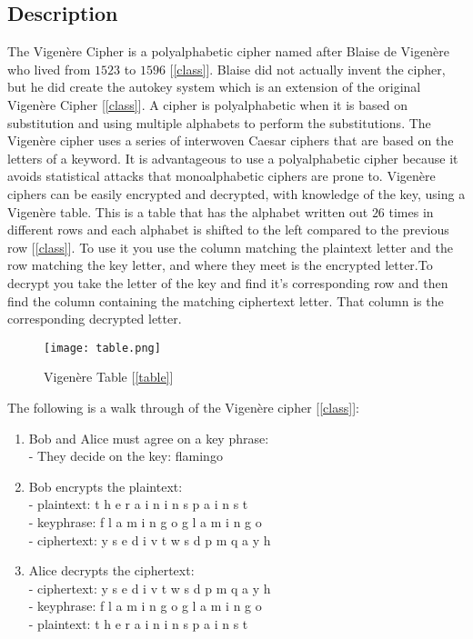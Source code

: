\documentclass[12pt]{article}
\begin{document}
\subsection{Description}
The Vigen\`ere Cipher is a polyalphabetic cipher named after Blaise de Vigen\`ere who lived from $1523$ to $1596$ [\ref{class}]. Blaise did not actually invent the cipher, but he did create the autokey system which is an extension of the original Vigen\`ere Cipher [\ref{class}]. A cipher is polyalphabetic when it is based on substitution and using multiple alphabets to perform the substitutions. The Vigen\`ere cipher uses a series of interwoven Caesar ciphers that are based on the letters of a keyword. It is advantageous to use a polyalphabetic cipher because it avoids statistical attacks that monoalphabetic ciphers are prone to. Vigen\`ere ciphers can be easily encrypted and decrypted, with knowledge of the key, using a Vigen\`ere table. This is a table that has the alphabet written out $26$ times in different rows and each alphabet is shifted to the left compared to the previous row [\ref{class}]. To use it you use the column matching the plaintext letter and the row matching the key letter, and where they meet is the encrypted letter.To decrypt you take the letter of the key and find it's corresponding row and then find the column containing the matching ciphertext letter. That column is the corresponding decrypted letter.
\begin{figure}[H]
        \texttt{[image: table.png]}
        \caption{Vigen\`ere Table [\ref{table}]}
        \label{fig:340}
    \end{figure}
The following is a walk through of the Vigen\`ere cipher [\ref{class}]:\\
\begin{enumerate}
    \item Bob and Alice must agree on a key phrase:\\
        - They decide on the key: flamingo
    \item Bob encrypts the plaintext:\\
    - plaintext: \hspace{1.8mm} t h e r a i n i n s p a i n s t\\
    - keyphrase: \hspace{.1mm} f l a m i n g o g l a m i n g o\\
    - ciphertext:\hspace{1.2mm} y s e d i v t w s d p m q a y h 
    \item Alice decrypts the ciphertext:\\
    - ciphertext:\hspace{1.2mm} y s e d i v t w s d p m q a y h\\ 
    - keyphrase: \hspace{.1mm} f l a m i n g o g l a m i n g o\\
    - plaintext: \hspace{1.8mm} t h e r a i n i n s p a i n s t
\end{enumerate}
\end{document}
